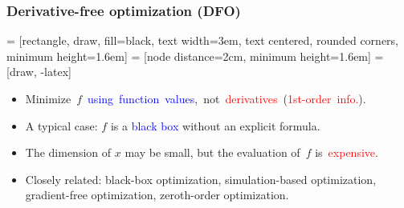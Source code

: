 \documentclass[slidestop,mathserif,xcolor=dvipsnames]{beamer}
\newcommand{\red}[1]{\textcolor{red}{#1}}
\begin{document}
\begin{frame}
    \frametitle{Derivative-free optimization (DFO)}
        \vspace{5ex}

 = [rectangle, draw, fill=black, text width=3em,
text centered, rounded corners, minimum height=1.6em]
 = [node distance=2cm, minimum height=1.6em]
 = [draw, -latex]

\begin{center}
\end{center}
        \vspace{3ex}
\begin{itemize}
\item \mbox{Minimize~$f$~\textcolor{blue}{using function
    values}, not \red{derivatives} (\red{1st-order info.})}.%
\vspace{1ex}
   \item A typical case: $f$ is a \textcolor{blue}{black box} without an explicit formula.

\vspace{1ex}
   \item The dimension of $x$ may be small, but the evaluation of~$f$ is~\red{expensive}.

\vspace{1ex}
   \item Closely related: black-box optimization, simulation-based optimization, gradient-free
       optimization, zeroth-order optimization.
 \end{itemize}

\end{frame}
\end{document}

